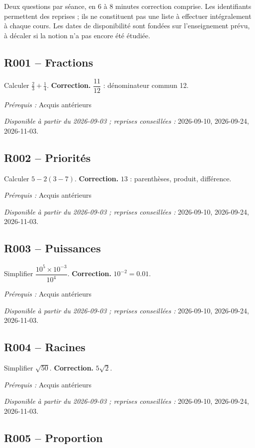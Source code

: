 \label{AUTO}
Deux questions par séance, en 6 à 8 minutes correction comprise. Les identifiants permettent des reprises ; ils ne constituent pas une liste à effectuer intégralement à chaque cours. Les dates de disponibilité sont fondées sur l’enseignement prévu, à décaler si la notion n’a pas encore été étudiée.
\subsection*{R001 -- Fractions}\label{R001}
Calculer $\frac23+\frac14$.
\ifmxteacher\textbf{Correction.} $\dfrac{11}{12}$ : dénominateur commun 12.\par\textit{Prérequis :} Acquis antérieurs\par\textit{Disponible à partir du 2026-09-03 ; reprises conseillées :} 2026-09-10, 2026-09-24, 2026-11-03.\fi
{}\subsection*{R002 -- Priorités}\label{R002}
Calculer $5-2(3-7)$.
\ifmxteacher\textbf{Correction.} $13$ : parenthèses, produit, différence.\par\textit{Prérequis :} Acquis antérieurs\par\textit{Disponible à partir du 2026-09-03 ; reprises conseillées :} 2026-09-10, 2026-09-24, 2026-11-03.\fi
{}\subsection*{R003 -- Puissances}\label{R003}
Simplifier $\dfrac{10^5\times 10^{-3}}{10^4}$.
\ifmxteacher\textbf{Correction.} $10^{-2}=\num{0,01}$.\par\textit{Prérequis :} Acquis antérieurs\par\textit{Disponible à partir du 2026-09-03 ; reprises conseillées :} 2026-09-10, 2026-09-24, 2026-11-03.\fi
{}\subsection*{R004 -- Racines}\label{R004}
Simplifier $\sqrt{50}$.
\ifmxteacher\textbf{Correction.} $5\sqrt2$.\par\textit{Prérequis :} Acquis antérieurs\par\textit{Disponible à partir du 2026-09-03 ; reprises conseillées :} 2026-09-10, 2026-09-24, 2026-11-03.\fi
{}\subsection*{R005 -- Proportion}\label{R005}
